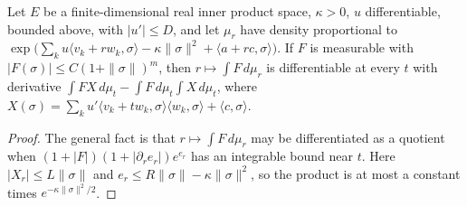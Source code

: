 \begin{lemma}\label{lem:sg-tal:st-differentiation}
  \leanok
Let $E$ be a finite-dimensional real inner product space, $\kappa>0$, $u$ differentiable, bounded above, with
$|u'|\le D$, and let $\mu_r$ have density proportional to
$\exp\bigl(\sum_ku\langle v_k+rw_k,\sigma\rangle-\kappa\|\sigma\|^2+\langle a+rc,\sigma\rangle\bigr)$. If $F$ is
measurable with $|F(\sigma)|\le C(1+\|\sigma\|)^m$, then $r\mapsto\int F\,d\mu_r$ is differentiable at every
$t$ with derivative $\int FX\,d\mu_t-\int F\,d\mu_t\int X\,d\mu_t$, where
$X(\sigma)=\sum_ku'\langle v_k+tw_k,\sigma\rangle\langle w_k,\sigma\rangle+\langle c,\sigma\rangle$.
\end{lemma}
\begin{proof}
  \leanok
The general fact is that $r\mapsto\int F\,d\mu_r$ may be differentiated as a quotient when
$(1+|F|)(1+|\partial_re_r|)e^{e_r}$ has an integrable bound near $t$. Here $|X_r|\le L\|\sigma\|$ and
$e_r\le R\|\sigma\|-\kappa\|\sigma\|^2$, so the product is at most a constant times
$e^{-\kappa\|\sigma\|^2/2}$.
\end{proof}

